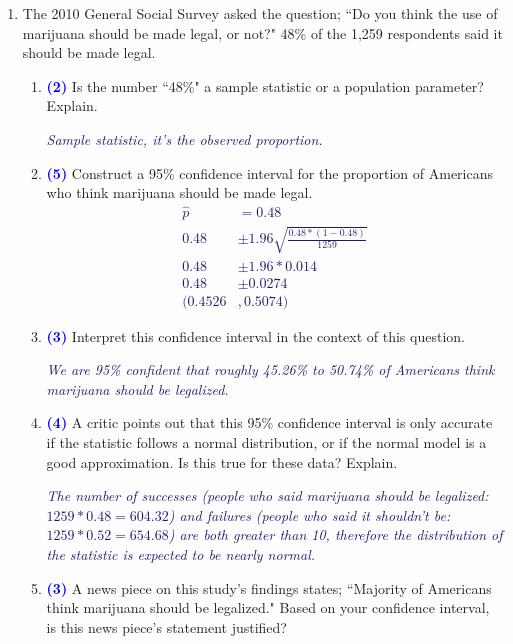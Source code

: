\documentclass[11pt]{article}
\newcommand{\soln}[1]{\textcolor{MidnightBlue}{\textit{#1}}}	%
\newcommand{\pts}[1]{ \textbf{{\footnotesize \textcolor{blue}{(#1)}}} }	%
\begin{document}
\begin{enumerate}
\begin{enumerate}
\end{enumerate}

%

\pagebreak

\item The 2010 General Social Survey asked the question; ``Do you think the use of marijuana should be made legal, or not?" 48\% of the 1,259 respondents said it should be made legal.

\begin{enumerate}

\item \pts{2} Is the number ``48\%" a sample statistic or a population parameter? Explain.

\soln{Sample statistic, it's the observed proportion.}

\item \pts{5} Construct a 95\% confidence interval for the proportion of Americans who think marijuana should be made legal.
\soln{
\begin{align*}
\hat{p} &= 0.48 \\
0.48 &\pm 1.96 \sqrt{ \frac{0.48 * (1 - 0.48)}{1259} } \\
0.48 &\pm 1.96 * 0.014 \\
0.48 &\pm 0.0274 \\
(0.4526 &, 0.5074)
\end{align*}
}
\item \pts{3} Interpret this confidence interval in the context of this question.

\soln{We are 95\% confident that roughly 45.26\% to 50.74\% of Americans think marijuana should be legalized.}
$\:$ \\

\item \pts{4} A critic points out that this 95\% confidence interval is only accurate if the statistic follows a normal distribution, or if the normal model is a good approximation. Is this true for these data? Explain.

\soln{The number of successes (people who said marijuana should be legalized: $1259 * 0.48 = 604.32$) and failures (people who said it shouldn't be: $1259 * 0.52 = 654.68$) are both greater than 10, therefore the distribution of the statistic is expected to be nearly normal.}
$\:$ \\
$\:$ \\
$\:$ \\

\item \pts{3} A news piece on this study's findings states; ``Majority of Americans think marijuana should be legalized." Based on your confidence interval, is this news piece's statement justified? 


\end{enumerate}
\end{enumerate}
\end{document}
